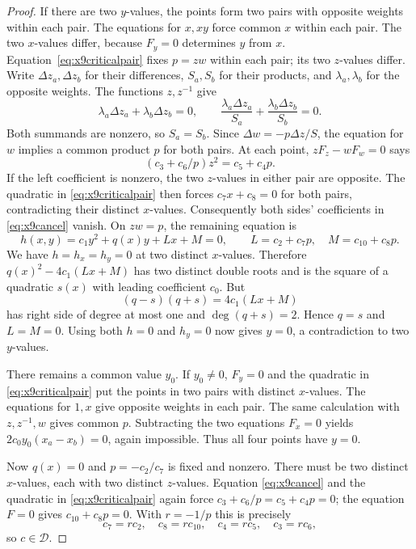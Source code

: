 \begin{proof}
If there are two $y$-values, the points form two pairs with opposite
weights within each pair. The equations for $x,xy$ force common $x$
within each pair. The two $x$-values differ, because $F_y=0$ determines
$y$ from $x$. Equation~\eqref{eq:x9criticalpair} fixes $p=zw$ within
each pair; its two $z$-values differ. Write $\Delta z_a,\Delta z_b$
for their differences, $S_a,S_b$ for their products, and
$\lambda_a,\lambda_b$ for the opposite weights. The functions $z,z^{-1}$
give
\[
 \lambda_a\Delta z_a+\lambda_b\Delta z_b=0,\qquad
 \frac{\lambda_a\Delta z_a}{S_a}
       +\frac{\lambda_b\Delta z_b}{S_b}=0.
\]
Both summands are nonzero, so $S_a=S_b$. Since
$\Delta w=-p\Delta z/S$, the equation for $w$ implies a common
product $p$ for both pairs. At each point, $zF_z-wF_w=0$ says
\begin{equation}\label{eq:x9cancel}
 (c_3+c_6/p)z^2=c_5+c_4p.
\end{equation}
If the left coefficient is nonzero, the two $z$-values in either pair
are opposite. The quadratic in \eqref{eq:x9criticalpair} then forces
$c_7x+c_8=0$ for both pairs, contradicting their distinct $x$-values.
Consequently both sides' coefficients in \eqref{eq:x9cancel} vanish.
On $zw=p$, the remaining equation is
\[
 h(x,y)=c_1y^2+q(x)y+Lx+M=0,\qquad
 L=c_2+c_7p,\quad M=c_{10}+c_8p.
\]
We have $h=h_x=h_y=0$ at two distinct $x$-values. Therefore
$q(x)^2-4c_1(Lx+M)$ has two distinct double roots and is the square of
a quadratic $s(x)$ with leading coefficient $c_0$. But
\[
 (q-s)(q+s)=4c_1(Lx+M)
\]
has right side of degree at most one and $\deg(q+s)=2$. Hence $q=s$
and $L=M=0$. Using both $h=0$ and $h_y=0$ now gives $y=0$, a
contradiction to two $y$-values.

There remains a common value $y_0$. If $y_0\ne0$, $F_y=0$ and the
quadratic in \eqref{eq:x9criticalpair} put the points in two pairs with
distinct $x$-values. The equations for $1,x$ give opposite weights in
each pair. The same calculation with $z,z^{-1},w$ gives common $p$.
Subtracting the two equations $F_x=0$ yields
$2c_0y_0(x_a-x_b)=0$, again impossible. Thus all four points have $y=0$.

Now $q(x)=0$ and $p=-c_2/c_7$ is fixed and nonzero. There must be two
distinct $x$-values, each with two distinct $z$-values. Equation
\eqref{eq:x9cancel} and the quadratic in \eqref{eq:x9criticalpair}
again force $c_3+c_6/p=c_5+c_4p=0$; the equation $F=0$ gives
$c_{10}+c_8p=0$. With $r=-1/p$ this is precisely
\[
 c_7=rc_2,\quad c_8=rc_{10},\quad c_4=rc_5,\quad c_3=rc_6,
\]
so $c\in\mathcal D$.


\end{proof}

